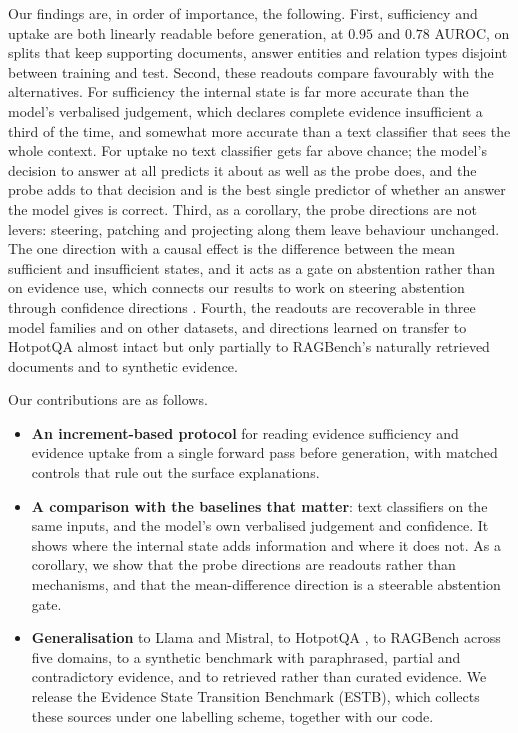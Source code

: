 Our findings are, in order of importance, the following. First, sufficiency and uptake are both linearly readable before generation, at $0.95$ and $0.78$ AUROC, on splits that keep supporting documents, answer entities and relation types disjoint between training and test. Second, these readouts compare favourably with the alternatives. For sufficiency the internal state is far more accurate than the model's verbalised judgement, which declares complete evidence insufficient a third of the time, and somewhat more accurate than a text classifier that sees the whole context. For uptake no text classifier gets far above chance; the model's decision to answer at all predicts it about as well as the probe does, and the probe adds to that decision and is the best single predictor of whether an answer the model gives is correct. Third, as a corollary, the probe directions are not levers: steering, patching and projecting along them leave behaviour unchanged. The one direction with a causal effect is the difference between the mean sufficient and insufficient states, and it acts as a gate on abstention rather than on evidence use, which connects our results to work on steering abstention through confidence directions \cite{ActivationSteering,Kumaran2026}. Fourth, the readouts are recoverable in three model families and on other datasets, and directions learned on \musique{} transfer to HotpotQA almost intact but only partially to RAGBench's naturally retrieved documents and to synthetic evidence.

Our contributions are as follows.
\begin{itemize}
  \item \textbf{An increment-based protocol} for reading evidence sufficiency and evidence uptake from a single forward pass before generation, with matched controls that rule out the surface explanations.
  \item \textbf{A comparison with the baselines that matter}: text classifiers on the same inputs, and the model's own verbalised judgement and confidence. It shows where the internal state adds information and where it does not. As a corollary, we show that the probe directions are readouts rather than mechanisms, and that the mean-difference direction is a steerable abstention gate.
  \item \textbf{Generalisation} to Llama and Mistral, to HotpotQA \cite{yang2018hotpotqa}, to RAGBench \cite{friel2024ragbench} across five domains, to a synthetic benchmark with paraphrased, partial and contradictory evidence, and to retrieved rather than curated evidence. We release the Evidence State Transition Benchmark (ESTB), which collects these sources under one labelling scheme, together with our code.
\end{itemize}
